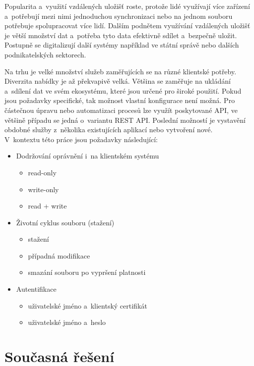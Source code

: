 Popularita a využití vzdálených uložišť roste, protože lidé využívají více zařízení a potřebují mezi nimi jednoduchou synchronizaci nebo na jednom souboru
potřebuje spolupracovat více lidí. Dalším podnětem využívání vzdálených uložišť je větší množství dat a potřeba tyto data efektivně sdílet a bezpečně uložit.
Postupně se digitalizují další systémy například ve státní správě nebo dalších podnikatelských sektorech. 

Na trhu je velké množství služeb zaměřujících se na různé klientské potřeby. Diverzita nabídky je až překvapivě velká. Většina se zaměřuje na ukládání a sdílení
dat ve svém ekosystému, které jsou určené pro široké použití. Pokud jsou požadavky specifické, tak možnost vlastní konfigurace není možná. Pro částečnou úpravu 
nebo automatizaci procesů lze využít poskytované API, ve většině případu se jedná o variantu REST API. Poslední možností je vystavění obdobné služby z několika
existujících aplikací nebo vytvoření nové.\\

\noindent V kontextu této práce jsou požadavky následující: 

\begin{itemize}
    \item Dodržování oprávnění i na klientském systému
    \begin{itemize}
        \item read-only
        \item write-only
        \item read + write
    \end{itemize}
    \item Životní cyklus souboru (stažení)
    \begin{itemize}
        \item stažení
        \item případná modifikace
        \item smazání souboru po vypršení platnosti
    \end{itemize}
    \item Autentifikace
    \begin{itemize}
        \item uživatelské jméno a klientský certifikát
        \item uživatelské jméno a heslo
    \end{itemize}
\end{itemize}

\section{Současná řešení}

